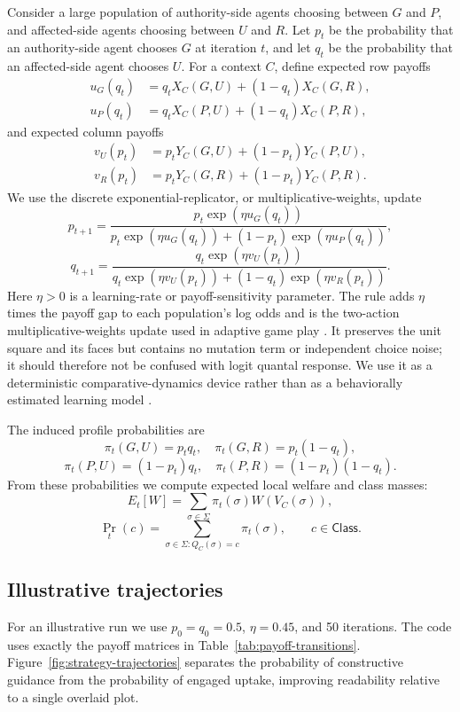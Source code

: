 \documentclass[a4paper,fleqn]{cas-dc}
\theoremstyle{remark}
\newcommand{\Class}{\mathsf{Class}}
\newcommand{\Prof}{\Sigma}
\begin{document}
Consider a large population of authority-side agents choosing between $G$ and $P$, and affected-side agents choosing between $U$ and $R$. Let $p_t$ be the probability that an authority-side agent chooses $G$ at iteration $t$, and let $q_t$ be the probability that an affected-side agent chooses $U$. For a context $C$, define expected row payoffs
\begin{align*}
u_G(q_t)&=q_tX_C(G,U)+(1-q_t)X_C(G,R),\\
u_P(q_t)&=q_tX_C(P,U)+(1-q_t)X_C(P,R),
\end{align*}
and expected column payoffs
\begin{align*}
v_U(p_t)&=p_tY_C(G,U)+(1-p_t)Y_C(P,U),\\
v_R(p_t)&=p_tY_C(G,R)+(1-p_t)Y_C(P,R).
\end{align*}
We use the discrete exponential-replicator, or multiplicative-weights, update
\[
p_{t+1}=\frac{p_t\exp(\eta u_G(q_t))}{p_t\exp(\eta u_G(q_t))+(1-p_t)\exp(\eta u_P(q_t))},
\]
\[
q_{t+1}=\frac{q_t\exp(\eta v_U(p_t))}{q_t\exp(\eta v_U(p_t))+(1-q_t)\exp(\eta v_R(p_t))}.
\]
Here $\eta>0$ is a learning-rate or payoff-sensitivity parameter. The rule adds $\eta$ times the payoff gap to each population's log odds and is the two-action multiplicative-weights update used in adaptive game play \citep{FreundSchapire1999}. It preserves the unit square and its faces but contains no mutation term or independent choice noise; it should therefore not be confused with logit quantal response. We use it as a deterministic comparative-dynamics device rather than as a behaviorally estimated learning model \citep{HofbauerSigmund1998,Sandholm2010}.

The induced profile probabilities are
\[
\pi_t(G,U)=p_tq_t,\quad \pi_t(G,R)=p_t(1-q_t),
\]
\[
\pi_t(P,U)=(1-p_t)q_t,\quad \pi_t(P,R)=(1-p_t)(1-q_t).
\]
From these probabilities we compute expected local welfare and class masses:
\[
E_t[W]=\sum_{\sigma\in\Prof}\pi_t(\sigma)W(V_C(\sigma)),
\]
\[
\Pr_t(c)=\sum_{\sigma\in\Prof:Q_C(\sigma)=c}\pi_t(\sigma),\qquad c\in\Class.
\]

\subsection{Illustrative trajectories}

For an illustrative run we use $p_0=q_0=0.5$, $\eta=0.45$, and 50 iterations. The code uses exactly the payoff matrices in Table~\ref{tab:payoff-transitions}. Figure~\ref{fig:strategy-trajectories} separates the probability of constructive guidance from the probability of engaged uptake, improving readability relative to a single overlaid plot.
\end{document}
